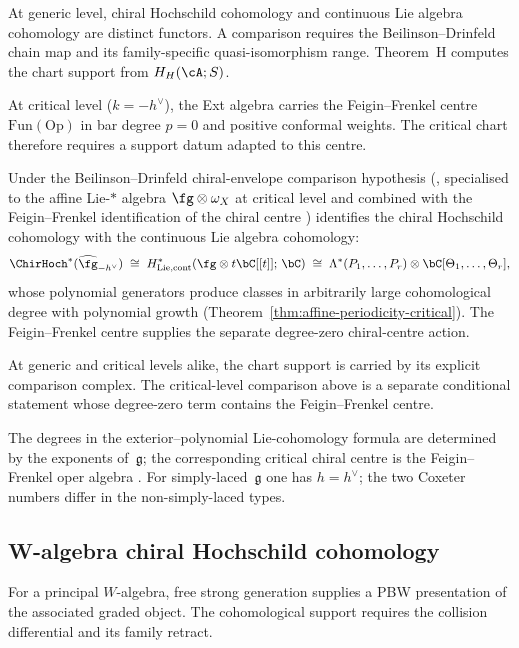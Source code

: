 \begin{remark}
\label{rem:critical-level-lie-vs-chirhoch}
At generic level, chiral Hochschild cohomology and continuous Lie
algebra cohomology are distinct functors.  A comparison requires the
Beilinson--Drinfeld chain map and its family-specific quasi-isomorphism
range.  Theorem~H computes the chart support from $H_H(\cA;S)$.

At critical level ($k=-h^\vee$), the Ext algebra carries the
Feigin--Frenkel centre $\mathrm{Fun}(\mathrm{Op})$ in bar degree
$p=0$ and positive conformal weights.  The critical chart therefore
requires a support datum adapted to this centre.

Under the Beilinson--Drinfeld chiral-envelope comparison hypothesis
(\cite[Theorem~4.8.1]{BD04}, specialised to the affine Lie-$*$ algebra
$\fg \otimes \omega_X$ at critical level and combined with the
Feigin--Frenkel identification of the chiral centre
\cite{Feigin-Frenkel}) identifies the chiral Hochschild
cohomology with the continuous Lie algebra cohomology:
\[
\ChirHoch^*(\widehat{\fg}_{-h^\vee})
\;\cong\;
H^*_{\mathrm{Lie,cont}}(\fg \otimes t\bC[[t]];\, \bC)
\;\cong\;
\Lambda^*(P_1, \ldots, P_r) \otimes \bC[\Theta_1, \ldots, \Theta_r],
\]
whose polynomial generators produce classes in arbitrarily large
cohomological degree with polynomial growth
(Theorem~\ref{thm:affine-periodicity-critical}).  The
Feigin--Frenkel centre supplies the separate degree-zero chiral-centre
action.

At generic and critical levels alike, the chart support is carried by
its explicit comparison complex.  The critical-level comparison above
is a separate conditional statement whose degree-zero term contains
the Feigin--Frenkel centre.
\end{remark}

The degrees in the exterior--polynomial Lie-cohomology formula are
determined by the exponents of~$\mathfrak g$; the corresponding
critical chiral centre is the Feigin--Frenkel oper algebra
\cite{Feigin-Frenkel}.  For simply-laced~$\mathfrak g$ one has
$h=h^\vee$; the two Coxeter numbers differ in the non-simply-laced
types.

\subsection{W-algebra chiral Hochschild cohomology}

For a principal $W$-algebra, free strong generation supplies a PBW
presentation of the associated graded object.  The cohomological
support requires the collision differential and its family retract.

